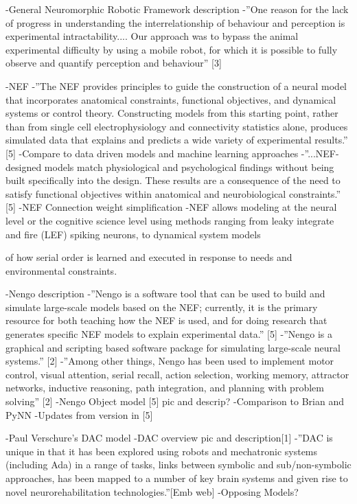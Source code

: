 -General Neuromorphic Robotic Framework description -\textquotedblright{}One
reason for the lack of progress in understanding the interrelationship
of behaviour and perception is experimental intractability.... Our
approach was to bypass the animal experimental diffi{}culty by using
a mobile robot, for which it is possible to fully observe and quantify
perception and behaviour\textquotedblright{} {[}3{]}

-NEF -\textquotedblright{}The NEF provides principles to guide the
construction of a neural model that incorporates anatomical constraints,
functional objectives, and dynamical systems or control theory. Constructing
models from this starting point, rather than from single cell electrophysiology
and connectivity statistics alone, produces simulated data that explains
and predicts a wide variety of experimental results.\textquotedblright{}
{[}5{]} -Compare to data driven models and machine learning approaches
-\textquotedblright{}...NEF-designed models match physiological and
psychological fi{}ndings without being built specifi{}cally into the
design. These results are a consequence of the need to satisfy functional
objectives within anatomical and neurobiological constraints.\textquotedblright{}
{[}5{]} -NEF Connection weight simplification -NEF allows modeling
at the neural level or the cognitive science level using methods ranging
from leaky integrate and fire (LEF) spiking neurons, to dynamical
system models 

of how serial order is learned and executed in response to needs and
environmental constraints.

-Nengo description -\textquotedblright{}Nengo is a software tool that
can be used to build and simulate large-scale models based on the
NEF; currently, it is the primary resource for both teaching how the
NEF is used, and for doing research that generates specifi{}c NEF
models to explain experimental data.\textquotedblright{} {[}5{]} -\textquotedblright{}Nengo
is a graphical and scripting based software package for simulating
large-scale neural systems.\textquotedblright{} {[}2{]} -\textquotedblright{}Among
other things, Nengo has been used to implement motor control, visual
attention, serial recall, action selection, working memory, attractor
networks, inductive reasoning, path integration, and planning with
problem solving\textquotedblright{} {[}2{]} -Nengo Object model {[}5{]}
pic and descrip? -Comparison to Brian and PyNN -Updates from version
in {[}5{]}

-Paul Verschure\textquoteright{}s DAC model -DAC overview pic and
description{[}1{]} -\textquotedblright{}DAC is unique in that it has
been explored using robots and mechatronic systems (including Ada)
in a range of tasks, links between symbolic and sub/non-symbolic approaches,
has been mapped to a number of key brain systems and given rise to
novel neurorehabilitation technologies.\textquotedblright{}{[}Emb
web{]} -Opposing Models?

